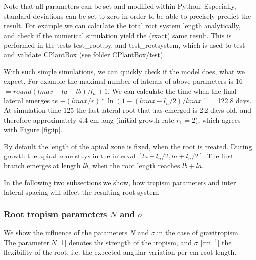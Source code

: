 Note that all parameters can be set and modified within Python. Especially, standard deviations can be set to zero in order to be able to precisely predict the result. For example we can calculate the total root system length analytically, and check if the numerical simulation yield the (exact) same result. This is performed in the tests test\_root.py, and test\_rootsystem, which is used to test and validate CPlantBox (see folder CPlantBox/test).

With such simple simulations, we can quickly check if the model does, what we expect. For example the maximal number of laterals of above parameters is 16 
$= round(lmax - la - lb)/l_n +  1$. We can calculate the time when the final lateral emerges as $-(lmax/r)*\ln(1-(lmax-l_n/2)/lmax)$ = 122.8 days. At simulation time 125 the last lateral root that has emerged is 2.2 days old, and therefore approximately 4.4 cm long (initial growth rate $r_1 = 2$), which agrees with Figure \ref{fig:ip}.

By default the length of the apical zone is fixed, when the root is created. During growth the apical zone stays in the interval $[la - l_n/2, la+l_n/2]$. The first branch emerges at length $lb$, when the root length reaches $lb +la$.

In the following two subsections we show, how tropism parameters and inter lateral spacing will affect the resulting root system.


\subsubsection*{Root tropism parameters $N$ and $\sigma$} \label{ssec:tropism}

We show the influence of the parameters $N$ and $\sigma$ in the case of gravitropism. The parameter $N$ [1] denotes the strength of the tropism, and $\sigma$ [cm$^{-1}$] the flexibility of the root, i.e. the expected angular variation per cm root length. 



